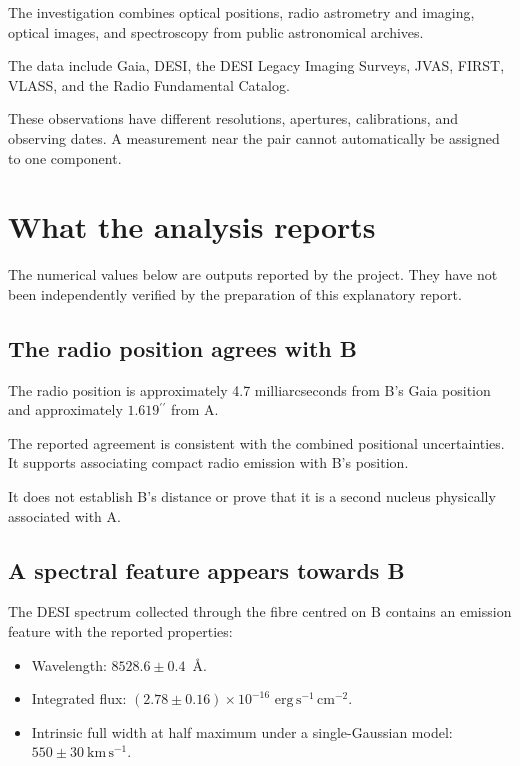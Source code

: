 \documentclass[11pt,a4paper]{article}
\newcommand{\arcsec}{\ensuremath{^{\prime\prime}}}
\begin{document}
The investigation combines optical positions, radio
astrometry and imaging, optical images, and spectroscopy
from public astronomical archives.

The data include Gaia, DESI, the DESI Legacy Imaging Surveys,
JVAS, FIRST, VLASS, and the Radio Fundamental Catalog.

These observations have different resolutions, apertures,
calibrations, and observing dates. A measurement near the pair
cannot automatically be assigned to one component.

\section{What the analysis reports}

The numerical values below are outputs reported by the project.
They have not been independently verified by the preparation
of this explanatory report.

\subsection{The radio position agrees with B}

The radio position is approximately 4.7 milliarcseconds from
B's Gaia position and approximately \(1.619\arcsec\) from A.

The reported agreement is consistent with the combined
positional uncertainties. It supports associating compact
radio emission with B's position.

It does not establish B's distance or prove that it is
a second nucleus physically associated with A.

\subsection{A spectral feature appears towards B}

The DESI spectrum collected through the fibre centred on B
contains an emission feature with the reported properties:

\begin{itemize}
    \item Wavelength:
    \(8528.6 \pm 0.4\)~\AA.

    \item Integrated flux:
    \((2.78 \pm 0.16)\times10^{-16}\)
    \(\mathrm{erg\,s^{-1}\,cm^{-2}}\).

    \item Intrinsic full width at half maximum under a
    single-Gaussian model:
    \(550 \pm 30\ \mathrm{km\,s^{-1}}\).
\end{itemize}
\end{document}
